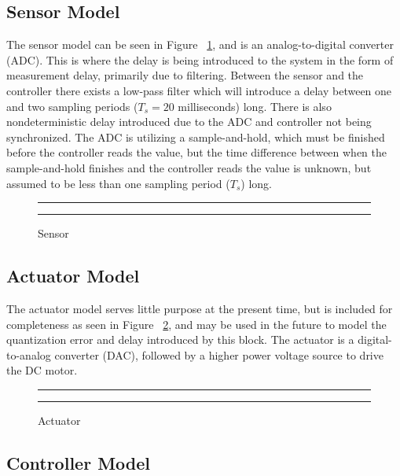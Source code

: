 \documentclass[conference]{IEEEtran}
\begin{document}
\subsection{Sensor Model}

The sensor model can be seen in Figure ~\ref{fig:sensor}, and is an analog-to-digital converter (ADC).  This is where the delay is being introduced to the system in the form of measurement delay, primarily due to filtering.  Between the sensor and the controller there exists a low-pass filter which will introduce a delay between one and two sampling periods ($T_s=20$ milliseconds) long.  There is also nondeterministic delay introduced due to the ADC and controller not being synchronized.  The ADC is utilizing a sample-and-hold, which must be finished before the controller reads the value, but the time difference between when the sample-and-hold finishes and the controller reads the value is unknown, but assumed to be less than one sampling period ($T_s$) long.

\begin{figure}[h!]
\centering
  \hrule
	{}
  \hrule
  \caption{Sensor}
  \label{fig:sensor}
\end{figure}

\subsection{Actuator Model}

The actuator model serves little purpose at the present time, but is included for completeness as seen in Figure ~\ref{fig:actuator}, and may be used in the future to model the quantization error and delay introduced by this block.  The actuator is a digital-to-analog converter (DAC), followed by a higher power voltage source to drive the DC motor.

\begin{figure}[h!]
\centering
  \hrule
	{}
  \hrule
  \caption{Actuator}
  \label{fig:actuator}
\end{figure}

\subsection{Controller Model}
\end{document}
